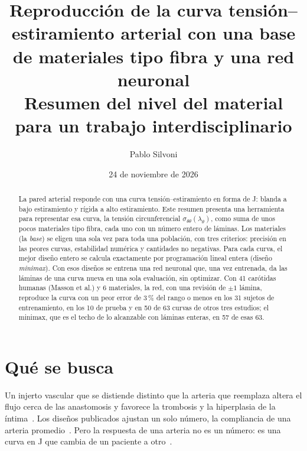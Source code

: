
\title{\textbf{Reproducción de la curva tensión--estiramiento arterial con una base de materiales tipo fibra y una red neuronal}\\[4pt]\large Resumen del nivel del material para un trabajo interdisciplinario}
\author{Pablo Silvoni}
\date{24 de noviembre de 2026}

\maketitle

\begin{abstract}
\noindent La pared arterial responde con una curva tensión--estiramiento en forma de J: blanda a bajo estiramiento y rígida a alto estiramiento. Este resumen presenta una herramienta para representar esa curva, la tensión circunferencial $\sigma_{\theta\theta}(\lambda_\theta)$, como suma de unos pocos materiales tipo fibra, cada uno con un número entero de láminas. Los materiales (la \emph{base}) se eligen una sola vez para toda una población, con tres criterios: precisión en las peores curvas, estabilidad numérica y cantidades no negativas. Para cada curva, el mejor diseño entero se calcula exactamente por programación lineal entera (diseño \emph{minimax}). Con esos diseños se entrena una red neuronal que, una vez entrenada, da las láminas de una curva nueva en una sola evaluación, sin optimizar. Con 41 carótidas humanas (Masson et al.) y 6 materiales, la red, con una revisión de $\pm1$ lámina, reproduce la curva con un peor error de 3\,\% del rango o menos en los 31 sujetos de entrenamiento, en los 10 de prueba y en 50 de 63 curvas de otros tres estudios; el minimax, que es el techo de lo alcanzable con láminas enteras, en 57 de esas 63.
\end{abstract}

\section{Qué se busca}
Un injerto vascular que se distiende distinto que la arteria que reemplaza altera el flujo cerca de las anastomosis y favorece la trombosis y la hiperplasia de la íntima~\cite{ding}. Los diseños publicados ajustan un solo número, la compliancia de una arteria promedio~\cite{harrison,tamimi,rovas23}. Pero la respuesta de una arteria no es un número: es una curva en J que cambia de un paciente a otro~\cite{holzapfel,humphrey}.

